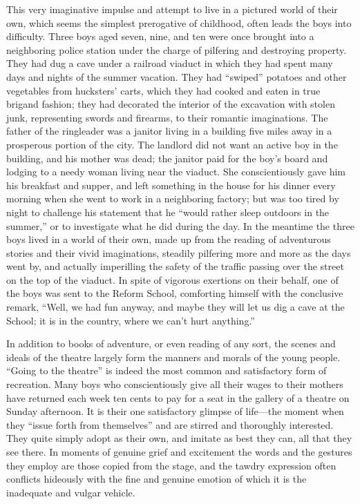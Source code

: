 \documentclass[]{article}
\begin{document}
\begin{sectionbody}
\addamsparagraph This very imaginative impulse and attempt to live in a pictured world of
their own, which seems the simplest prerogative of childhood, often
leads the boys into difficulty. Three boys aged seven, nine, and ten
were once brought into a neighboring police station under the charge of
pilfering and destroying property. They had dug a cave under a railroad
viaduct in which they had spent many days and nights of the summer
vacation. They had ``swiped'' potatoes and other vegetables from
hucksters' carts, which they had cooked and eaten in true brigand
fashion; they had decorated the interior of the excavation with stolen
junk, representing swords and firearms, to their romantic imaginations.
The father of the ringleader was a janitor living in a building five
miles away in a prosperous portion of the city. The landlord did not
want an active boy in the building, and his mother was dead; the janitor
paid for the boy's board and lodging to a needy woman living near the
viaduct. She conscientiously gave him his breakfast and supper, and left
something in the house for his dinner every morning when she went to
work in a neighboring factory; but was too tired by night to challenge
his statement that he ``would rather sleep outdoors in the summer,'' or to
investigate what he did during the day. In the meantime the three boys
lived in a world of their own, made up from the reading of adventurous
stories and their vivid imaginations, steadily pilfering more and more
as the days went by, and actually imperilling the safety of the traffic
passing over the street on the top of the viaduct. In spite of vigorous
exertions on their behalf, one of the boys was sent to the Reform
School, comforting himself with the conclusive remark, ``Well, we had fun
anyway, and maybe they will let us dig a cave at the School; it is in
the country, where we can't hurt anything.''

\addamsparagraph In addition to books of adventure, or even reading of any sort, the
scenes and ideals of the theatre largely form the manners and morals of
the young people. ``Going to the theatre'' is indeed the most common and
satisfactory form of recreation. Many boys who conscientiously give all
their wages to their mothers have returned each week ten cents to pay
for a seat in the gallery of a theatre on Sunday afternoon. It is their
one satisfactory glimpse of life---the moment when they ``issue forth from
themselves'' and are stirred and thoroughly interested. They quite simply
adopt as their own, and imitate as best they can, all that they see
there. In moments of genuine grief and excitement the words and the
gestures they employ are those copied from the stage, and the tawdry
expression often conflicts hideously with the fine and genuine emotion
of which it is the inadequate and vulgar vehicle.


\end{sectionbody}
\end{document}
